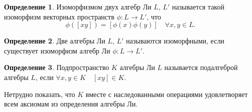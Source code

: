 \documentclass[a4paper, 12pt]{article}
\theoremstyle{definition}
\newtheorem{definition}{Определение}[section]
\begin{document}
\begin{definition}
    \label{def:isomorphism}
    Изоморфизмом двух алгебр Ли \( L \), \( L' \) называется такой изоморфизм векторных пространств \( \phi : L \to L' \), что
    \[
        \phi([x y]) = [\phi(x) \phi(y)] \quad \forall x, y \in L.
    \]
\end{definition}

\begin{definition}
    \label{def:isomorphousness}
    Две алгебры Ли \( L \), \( L' \) называются изоморфными, если существует изоморфизм алгебр Ли \( \phi : L \to L' \).
\end{definition}

\begin{definition}
    Подпространство \( K \) алгебры Ли \( L \) называется подалгеброй алгебры \( L \), если \( \forall x, y \in K \quad [x y] \in K \).
\end{definition}

Нетрудно показать, что \( K \) вместе с наследованными операциями удовлетворяет всем аксиомам из определения алгебры Ли.
\end{document}
